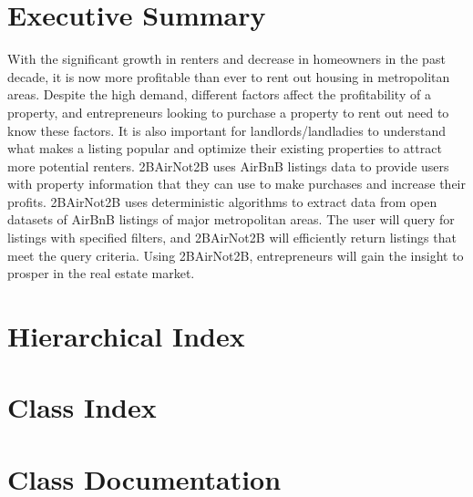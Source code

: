 \let\mypdfximage\pdfximage\def\pdfximage{\immediate\mypdfximage}\documentclass[oneside]{book}
\newcommand{\+}{\discretionary{\mbox{\scriptsize$\hookleftarrow$}}{}{}}
\newcommand{\clearemptydoublepage}{%
  \newpage{\pagestyle{empty}\cleardoublepage}%
}
\begin{document}
\chapter{Executive Summary}
With the significant growth in renters and decrease in homeowners in the past decade, it is now more profitable than ever to rent out housing in metropolitan areas. Despite the high demand, different factors affect the profitability of a property, and entrepreneurs looking to purchase a property to rent out need to know these factors. It is also important for landlords/landladies to understand what makes a listing popular and optimize their existing properties to attract more potential renters. 2BAirNot2B uses AirBnB listings data to provide users with property information that they can use to make purchases and increase their profits. 2BAirNot2B uses deterministic algorithms to extract data from open datasets of AirBnB listings of major metropolitan areas. The user will query for listings with specified filters, and 2BAirNot2B will efficiently return listings that meet the query criteria. Using 2BAirNot2B, entrepreneurs will gain the insight to prosper in the real estate market.

\hypersetup{pageanchor=true}

\chapter{Hierarchical Index}

\chapter{Class Index}

\chapter{Class Documentation}

















\backmatter
\newpage
{}
\clearemptydoublepage
{}
\printindex
\end{document}
